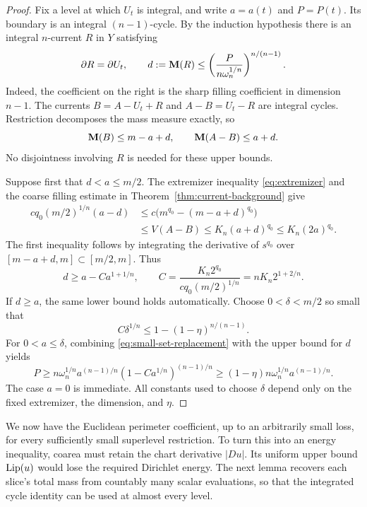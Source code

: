 \begin{proof}
Fix a level at which $U_t$ is integral, and write $a=a(t)$ and $P=P(t)$.
Its boundary is an integral $(n-1)$-cycle.  By the induction hypothesis
there is an integral $n$-current $R$ in $Y$ satisfying
\[
 \partial R=\partial U_t,\qquad
 d:=\mathbf M(R)\le
 \left(\frac{P}{n\omega_n^{1/n}}\right)^{n/(n-1)}.
\]
Indeed, the coefficient on the right is the sharp filling coefficient
in dimension $n-1$.  The currents $B=A-U_t+R$ and $A-B=U_t-R$ are
integral cycles.  Restriction decomposes the mass measure exactly, so
\[
 \mathbf M(B)\le m-a+d,\qquad \mathbf M(A-B)\le a+d.
\]
No disjointness involving $R$ is needed for these upper bounds.

Suppose first that $d<a\le m/2$.  The extremizer inequality
\eqref{eq:extremizer} and the coarse filling estimate in
Theorem~\ref{thm:current-background} give
\begin{align*}
 cq_0(m/2)^{1/n}(a-d)
 &\le c\bigl(m^{q_0}-(m-a+d)^{q_0}\bigr)\\
 &\le V(A-B)
 \le K_n(a+d)^{q_0}
 \le K_n(2a)^{q_0}.
\end{align*}
The first inequality follows by integrating the derivative of
$s^{q_0}$ over $[m-a+d,m]\subset[m/2,m]$.  Thus
\begin{equation}
 d\ge a-Ca^{1+1/n},\qquad
 C=\frac{K_n2^{q_0}}{cq_0(m/2)^{1/n}}
   =nK_n2^{1+2/n}.
 \label{eq:small-set-replacement}
\end{equation}
If $d\ge a$, the same lower bound holds automatically.  Choose
$0<\delta<m/2$ so small that
\[
 C\delta^{1/n}\le1-(1-\eta)^{n/(n-1)}.
\]
For $0<a\le\delta$, combining \eqref{eq:small-set-replacement} with the
upper bound for $d$ yields
\[
 P\ge n\omega_n^{1/n}a^{(n-1)/n}
           (1-Ca^{1/n})^{(n-1)/n}
   \ge (1-\eta)n\omega_n^{1/n}a^{(n-1)/n}.
\]
The case $a=0$ is immediate.  All constants used to choose $\delta$
depend only on the fixed extremizer, the dimension, and $\eta$.
\end{proof}

We now have the Euclidean perimeter coefficient, up to an arbitrarily
small loss, for every sufficiently small superlevel restriction. To turn
this into an energy inequality, coarea must retain the chart derivative
$|Du|$. Its uniform upper bound $\operatorname{Lip}(u)$ would lose the required
Dirichlet energy. The next lemma recovers each slice's total mass from
countably many scalar evaluations, so that the integrated cycle identity
can be used at almost every level.

